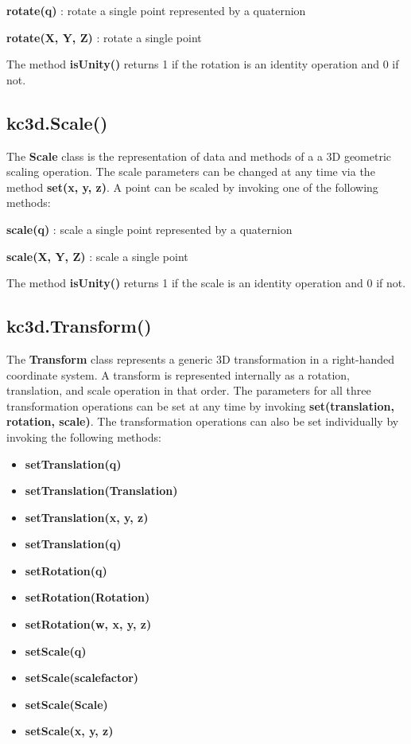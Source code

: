 \documentclass[a4paper, dvipdfm]{article}
\begin{document}
\textbf{rotate(q)} : rotate a single point represented by a quaternion

\textbf{rotate(X, Y, Z)} : rotate a single point

The method \textbf{isUnity()} returns 1 if the rotation is an identity operation and
0 if not.

\subsection{kc3d.Scale()}
The \textbf{Scale} class is the representation of data and methods of a
a 3D geometric scaling operation.  The scale parameters can be changed at
any time via the method \textbf{set(x, y, z)}. A point can be scaled by invoking
one of the following methods:

\textbf{scale(q)} : scale a single point represented by a quaternion

\textbf{scale(X, Y, Z)} : scale a single point

The method \textbf{isUnity()} returns 1 if the scale is an identity operation and
0 if not.

\subsection{kc3d.Transform()}
The \textbf{Transform} class represents a generic 3D transformation in a right-handed
coordinate system. A transform is represented internally as a rotation, translation,
and scale operation in that order.  The parameters for all three transformation
operations can be set at any time by invoking \textbf{set(translation, rotation, scale)}.
The transformation operations can also be set individually by invoking the following
methods:

\begin{itemize}
\item \textbf{setTranslation(q)}\\
\item \textbf{setTranslation(Translation)}\\
\item \textbf{setTranslation(x, y, z)}\\
\item \textbf{setTranslation(q)}\\
\item \textbf{setRotation(q)}\\
\item \textbf{setRotation(Rotation)}\\
\item \textbf{setRotation(w, x, y, z)}\\
\item \textbf{setScale(q)}\\
\item \textbf{setScale(scalefactor)}\\
\item \textbf{setScale(Scale)}\\
\item \textbf{setScale(x, y, z)}\\
\end{itemize}
\end{document}
